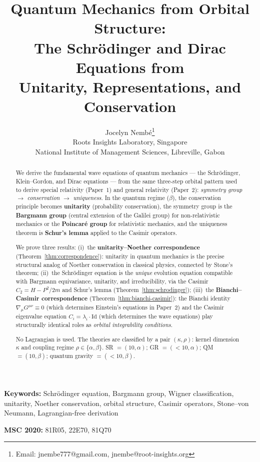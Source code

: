 \documentclass[12pt]{article}
\title{\textbf{Quantum Mechanics from Orbital Structure:\\The Schr\"odinger and Dirac Equations from\\Unitarity, Representations, and Conservation}}
\author{Jocelyn Nemb\'e\thanks{Email: jnembe777@gmail.com, jnembe@root-insights.org}\\[0.3em]
\small Roots Insights Laboratory, Singapore\\
\small National Institute of Management Sciences, Libreville, Gabon}
\date{}
\theoremstyle{plain}
\theoremstyle{definition}
\theoremstyle{remark}
\begin{document}
\maketitle

\begin{abstract}
We derive the fundamental wave equations of quantum mechanics --- the Schr\"odinger, Klein--Gordon, and Dirac equations --- from the same three-step orbital pattern used to derive special relativity (Paper~1) and general relativity (Paper~2): \emph{symmetry group $\to$ conservation $\to$ uniqueness}. In the quantum regime ($\beta$), the conservation principle becomes \textbf{unitarity} (probability conservation), the symmetry group is the \textbf{Bargmann group} (central extension of the Galilei group) for non-relativistic mechanics or the \textbf{Poincar\'e group} for relativistic mechanics, and the uniqueness theorem is \textbf{Schur's lemma} applied to the Casimir operators.

We prove three results: (i)~the \textbf{unitarity--Noether correspondence} (Theorem~\ref{thm:correspondence}): unitarity in quantum mechanics is the precise structural analog of Noether conservation in classical physics, connected by Stone's theorem; (ii)~the Schr\"odinger equation is the \emph{unique} evolution equation compatible with Bargmann equivariance, unitarity, and irreducibility, via the Casimir $C_2 = H - P^2/2m$ and Schur's lemma (Theorem~\ref{thm:schrodinger}); (iii)~the \textbf{Bianchi--Casimir correspondence} (Theorem~\ref{thm:bianchi-casimir}): the Bianchi identity $\nabla_\mu G^{\mu\nu} \equiv 0$ (which determines Einstein's equations in Paper~2) and the Casimir eigenvalue equation $C_i = \lambda_i \cdot \mathrm{Id}$ (which determines the wave equations) play structurally identical roles as \emph{orbital integrability conditions}.

No Lagrangian is used. The theories are classified by a pair $(\kappa, \rho)$: kernel dimension $\kappa$ and coupling regime $\rho \in \{\alpha, \beta\}$. SR $= (10, \alpha)$; GR $= (<\!10, \alpha)$; QM $= (10, \beta)$; quantum gravity $= (<\!10, \beta)$.
\end{abstract}

\noindent\textbf{Keywords:} Schr\"odinger equation, Bargmann group, Wigner classification, unitarity, Noether conservation, orbital structure, Casimir operators, Stone--von Neumann, Lagrangian-free derivation

\noindent\textbf{MSC 2020:} 81R05, 22E70, 81Q70
\end{document}
